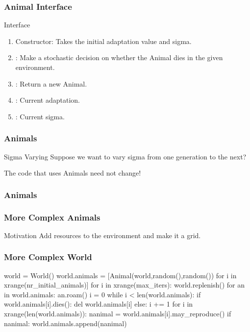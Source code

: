 \begin{frame}[fragile] %
\frametitle{Animal Interface}

\begin{block}{Interface}
\begin{enumerate}
\item Constructor: Takes the initial adaptation value and sigma.
\item {}: Make a stochastic decision on whether the Animal dies in the given environment.
\item {}: Return a new Animal.
\item {}: Current adaptation.
\item {}: Current sigma.
\end{enumerate}
\end{block}
\end{frame}

\begin{frame}[fragile] %
\frametitle{Animals}
\begin{block}{Sigma Varying}
Suppose we want to vary sigma from one generation to the next?
\end{block}

The \alert{code that uses Animals} need not change!
\end{frame}
\begin{frame}[fragile] %
\frametitle{Animals}

\end{frame}

\begin{frame}[fragile] %
\frametitle{More Complex Animals}
\begin{block}{Motivation}
Add resources to the environment and make it a grid.
\end{block}
\end{frame}

\begin{frame}[fragile] %
\frametitle{More Complex World}

\begin{python}
world = World()
world.animals = [Animal(world,random(),random())
                for i in xrange(nr_initial_animals)]
for i in xrange(max_iters):
    world.replenish()
    for an in world.animals: an.roam()
    i = 0
    while i < len(world.animals):
        if world.animals[i].dies():
            del world.animals[i]
        else: i += 1
    for i in xrange(len(world.animals)):
        nanimal = world.animals[i].may_reproduce()
        if nanimal:
            world.animals.append(nanimal)
\end{python}
\end{frame}

